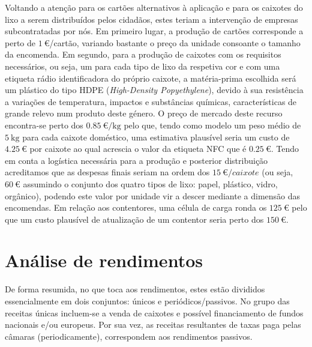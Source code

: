 \documentclass[11pt, a4paper, oneside]{book}
\begin{document}
Voltando a atenção para os cartões alternativos à aplicação e para os caixotes do lixo a serem distribuídos pelos cidadãos, estes teriam a intervenção de empresas subcontratadas por nós. Em primeiro lugar, a produção de cartões corresponde a perto de $\SI{1}{\euro}$/cartão, variando bastante o preço da unidade consoante o tamanho da encomenda. Em segundo, para a produção de caixotes com os requisitos necessários, ou seja, um para cada tipo de lixo da respetiva cor e com uma etiqueta rádio identificadora do próprio caixote, a matéria-prima escolhida será um plástico do tipo HDPE (\textit{High-Density Popyethylene}), devido à sua resistência a variações de temperatura, impactos e substâncias químicas, características de grande relevo num produto deste género. O preço de mercado deste recurso encontra-se perto dos $\SI{0.85}{\euro/\kilogram}$ pelo que, tendo como modelo um peso médio de $\SI{5}{\kilogram}$ para cada caixote doméstico, uma estimativa plausível seria um custo de $\SI{4.25}{\euro}$ por caixote ao qual acrescia o valor da etiqueta NFC que é $\SI{0.25}{\euro}$.
Tendo em conta a logística necessária para a produção e posterior distribuição acreditamos que as despesas finais seriam na ordem dos $\SI{15}{\euro/caixote}$ (ou seja, $\SI{60}{\euro}$ assumindo o conjunto dos quatro tipos de lixo: papel, plástico, vidro, orgânico), podendo este valor por unidade vir a descer mediante a dimensão das encomendas.
Em relação aos contentores, uma célula de carga ronda os $\SI{125}{\euro}$ pelo que um custo plausível de atualização de um contentor seria perto dos $\SI{150}{\euro}$.

\section{Análise de rendimentos}

De forma resumida, no que toca aos rendimentos, estes estão divididos essencialmente em dois conjuntos: únicos e periódicos/passivos. No grupo das receitas únicas incluem-se a venda de caixotes e possível financiamento de fundos nacionais e/ou europeus. Por sua vez, as receitas resultantes de taxas paga pelas câmaras (periodicamente), correspondem aos rendimentos passivos.
\end{document}
